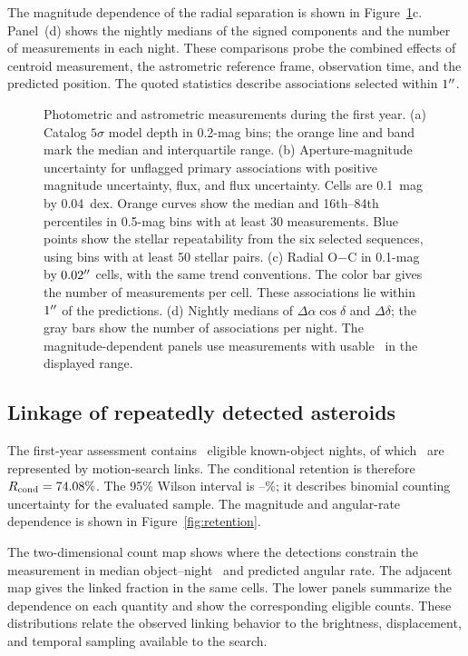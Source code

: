 The magnitude dependence of the radial separation is shown in
Figure~\ref{fig:quality}c. Panel~(d) shows the nightly medians of
the signed components and the number of measurements in each
night. These comparisons probe the combined effects of centroid
measurement, the astrometric reference frame, observation time,
and the predicted position. The quoted statistics describe
associations selected within $1^{\prime\prime}$.

\begin{figure}[tbp]
\centering
{}
\caption{Photometric and astrometric measurements during the first
year. (a) Catalog $5\sigma$ model depth in 0.2-mag bins; the orange
line and band mark the median and interquartile range.
(b) Aperture-magnitude uncertainty for unflagged primary associations
with positive magnitude uncertainty, flux, and flux uncertainty.
Cells are 0.1~mag by 0.04~dex. Orange curves show the median and
16th--84th percentiles in 0.5-mag bins with at least 30 measurements.
Blue points show the stellar repeatability from the six selected
sequences, using bins with at least 50 stellar pairs.
(c) Radial O$-$C in 0.1-mag by $0.02^{\prime\prime}$ cells, with the same
trend conventions. The color bar gives the number of measurements
per cell. These associations lie within $1^{\prime\prime}$ of the predictions.
(d) Nightly medians of $\Delta\alpha\cos\delta$ and $\Delta\delta$;
the gray bars show the number of associations per night.
The magnitude-dependent panels use measurements with usable
\gaper\ in the displayed range.}
\label{fig:quality}
\end{figure}

\subsection{Linkage of repeatedly detected asteroids}
\label{sec:retention_results}

The first-year assessment contains \yrNEligible\ eligible known-object
nights, of which \yrNLinked\ are represented by motion-search links.
The conditional retention is therefore $R_{\rm cond}=74.08\%$.
The 95\% Wilson interval is \yrRetentionLow--\yrRetentionHigh\%;
it describes binomial counting uncertainty for the evaluated sample.
The magnitude and angular-rate dependence is shown in
Figure~\ref{fig:retention}.

The two-dimensional count map shows where the detections constrain
the measurement in median object--night \gaper\ and predicted
angular rate. The adjacent map gives the linked fraction in the
same cells. The lower panels summarize the dependence on each
quantity and show the corresponding eligible counts. These
distributions relate the observed linking behavior to the brightness,
displacement, and temporal sampling available to the search.

